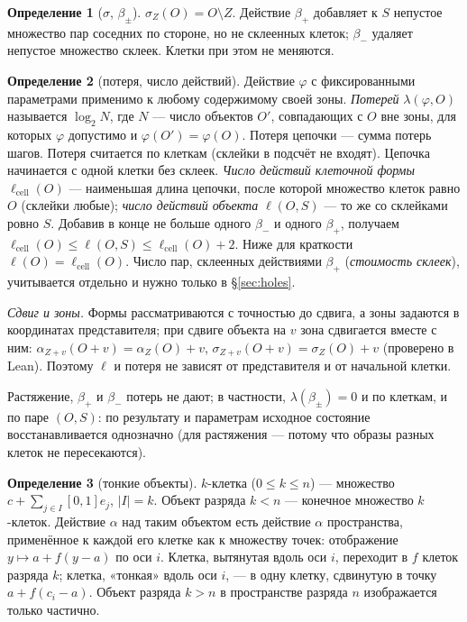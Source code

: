 \documentclass[11pt,a4paper]{article}
\theoremstyle{plain}
\theoremstyle{definition}
\newtheorem{definition}{Определение}
\theoremstyle{remark}
\newcommand{\lo}{\lambda}
\begin{document}
\begin{definition}[$\sigma$, $\beta_\pm$]
$\sigma_Z(O)=O\setminus Z$. Действие $\beta_+$ добавляет к $S$ непустое множество пар соседних по стороне, но не склеенных клеток; $\beta_-$ удаляет непустое множество склеек. Клетки при этом не меняются.
\end{definition}

\begin{definition}[потеря, число действий]
Действие $\varphi$ с фиксированными параметрами применимо к любому содержимому своей зоны. \emph{Потерей} $\lo(\varphi,O)$ называется $\log_2 N$, где $N$ — число объектов $O'$, совпадающих с $O$ вне зоны, для которых $\varphi$ допустимо и $\varphi(O')=\varphi(O)$. Потеря цепочки — сумма потерь шагов. Потеря считается по клеткам (склейки в подсчёт не входят). Цепочка начинается с одной клетки без склеек. \emph{Число действий клеточной формы} $\ell_{\mathrm{cell}}(O)$ — наименьшая длина цепочки, после которой множество клеток равно $O$ (склейки любые); \emph{число действий объекта} $\ell(O,S)$ — то же со склейками ровно $S$. Добавив в конце не больше одного $\beta_-$ и одного $\beta_+$, получаем $\ell_{\mathrm{cell}}(O)\le\ell(O,S)\le\ell_{\mathrm{cell}}(O)+2$. Ниже для краткости $\ell(O)=\ell_{\mathrm{cell}}(O)$. Число пар, склеенных действиями $\beta_+$ (\emph{стоимость склеек}), учитывается отдельно и нужно только в §\ref{sec:holes}.

\emph{Сдвиг и зоны.} Формы рассматриваются с точностью до сдвига, а зоны задаются в координатах представителя; при сдвиге объекта на $v$ зона сдвигается вместе с ним: $\alpha_{Z+v}(O+v)=\alpha_Z(O)+v$, $\sigma_{Z+v}(O+v)=\sigma_Z(O)+v$ (проверено в Lean). Поэтому $\ell$ и потеря не зависят от представителя и от начальной клетки.
\end{definition}

Растяжение, $\beta_+$ и $\beta_-$ потерь не дают; в частности, $\lambda(\beta_\pm)=0$ и по клеткам, и по паре $(O,S)$: по результату и параметрам исходное состояние восстанавливается однозначно (для растяжения — потому что образы разных клеток не пересекаются).

\begin{definition}[тонкие объекты]
$k$-клетка ($0\le k\le n$) — множество $c+\sum_{j\in I}[0,1]e_j$, $|I|=k$. Объект разряда $k<n$ — конечное множество $k$-клеток. Действие $\alpha$ над таким объектом есть действие $\alpha$ пространства, применённое к каждой его клетке как к множеству точек: отображение $y\mapsto a+f(y-a)$ по оси $i$. Клетка, вытянутая вдоль оси $i$, переходит в $f$ клеток разряда $k$; клетка, «тонкая» вдоль оси $i$, — в одну клетку, сдвинутую в точку $a+f(c_i-a)$. Объект разряда $k>n$ в пространстве разряда $n$ изображается только частично.
\end{definition}
\end{document}
